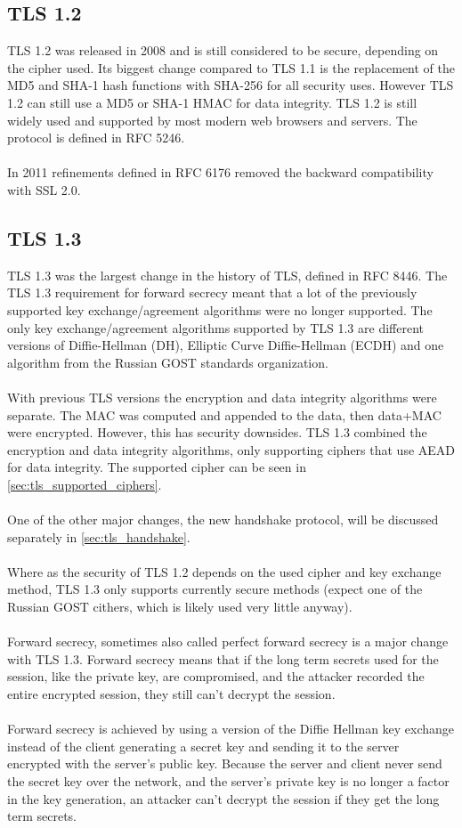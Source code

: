 \subsection{TLS 1.2}

TLS 1.2 was released in 2008 and is still considered to be secure, depending on the cipher used. Its biggest change compared to TLS 1.1 is the replacement of the MD5 and SHA-1 hash functions with SHA-256 for all security uses. However TLS 1.2 can still use a MD5 or SHA-1 HMAC for data integrity. TLS 1.2 is still widely used and supported by most modern web browsers and servers. The protocol is defined in RFC 5246.
\\\\
In 2011 refinements defined in RFC 6176 removed the backward compatibility with SSL 2.0.

\subsection{TLS 1.3}

TLS 1.3 was the largest change in the history of TLS, defined in RFC 8446. The TLS 1.3 requirement for forward secrecy meant that a lot of the previously supported key exchange/agreement algorithms were no longer supported. The only key exchange/agreement algorithms supported by TLS 1.3 are different versions of Diffie-Hellman (DH), Elliptic Curve Diffie-Hellman (ECDH) and one algorithm from the Russian GOST standards organization. 
\\\\
With previous TLS versions the encryption and data integrity algorithms were separate. The MAC was computed and appended to the data, then data+MAC were encrypted. However, this has security downsides. TLS 1.3 combined the encryption and data integrity algorithms, only supporting ciphers that use AEAD for data integrity. The supported cipher can be seen in \ref{sec:tls_supported_ciphers}.
\\\\
One of the other major changes, the new handshake protocol, will be discussed separately in \ref{sec:tls_handshake}.
\\\\
Where as the security of TLS 1.2 depends on the used cipher and key exchange method, TLS 1.3 only supports currently secure methods (expect one of the Russian GOST cithers, which is likely used very little anyway).
\\\\
Forward secrecy, sometimes also called perfect forward secrecy is a major change with TLS 1.3. Forward secrecy means that if the long term secrets used for the session, like the private key, are compromised, and the attacker recorded the entire encrypted session, they still can't decrypt the session.
\\\\
Forward secrecy is achieved by using a version of the Diffie Hellman key exchange instead of the client generating a secret key and sending it to the server encrypted with the server's public key. Because the server and client never send the secret key over the network, and the server's private key is no longer a factor in the key generation, an attacker can't decrypt the session if they get the long term secrets.